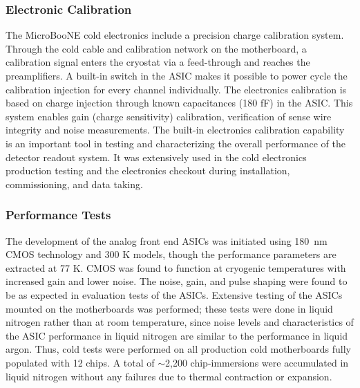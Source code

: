 \subsubsection{Electronic Calibration}

The MicroBooNE cold electronics include a precision charge calibration system. Through the cold cable and calibration network on the motherboard, a calibration signal enters the cryostat via a feed-through and reaches the preamplifiers. A built-in switch in the ASIC makes it possible to power cycle the calibration injection for every channel individually. The electronics calibration is based on charge injection through known capacitances (180 fF) in the ASIC. This system enables gain (charge sensitivity) calibration, verification of sense wire integrity and noise measurements. The built-in electronics calibration capability is an important tool in testing and characterizing the overall performance of the detector readout system. It was extensively used in the cold electronics production testing and the electronics checkout during installation, commissioning, and data taking.
 
\subsubsection{Performance Tests}

The development of the analog front end ASICs was initiated using 180~nm CMOS technology and 300 K models, though the performance parameters are extracted at 77 K. CMOS was found to function at cryogenic temperatures with increased gain and lower noise. The noise, gain, and pulse shaping were found to be as expected in evaluation tests of the ASICs. Extensive testing of the ASICs mounted on the motherboards was performed; these tests were done in liquid nitrogen rather than at room temperature, since noise levels and characteristics of the ASIC performance in liquid nitrogen are similar to the performance in liquid argon.  Thus, cold tests were performed on all production cold motherboards fully populated with 12 chips. A total of $\sim$2,200 chip-immersions were accumulated in liquid nitrogen without any failures due to thermal contraction or expansion. 

